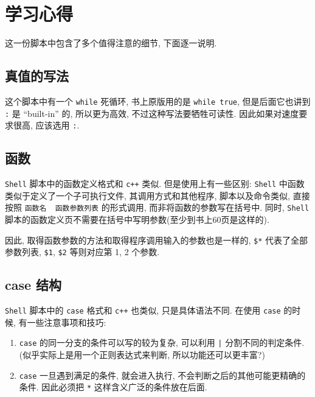 \documentclass{ctexart}
\begin{document}
\section{学习心得} %
\label{sec:学习心得}
这一份脚本中包含了多个值得注意的细节, 下面逐一说明. \par
\subsection{真值的写法} %
\label{sub:真值的写法}
这个脚本中有一个 \verb|while| 死循环, 书上原版用的是 \verb|while true|, 但是后面它也讲到 \verb|:| 是 ``built-in'' 的, 所以更为高效, 不过这种写法要牺牲可读性. 因此如果对速度要求很高, 应该选用 \verb|:|.
\subsection{函数} %
\label{sub:函数}
\verb|Shell| 脚本中的函数定义格式和 \verb|c++| 类似. 但是使用上有一些区别: \verb|Shell| 中函数类似于定义了一个子可执行文件, 其调用方式和其他程序, 脚本以及命令类似, 直接按照 \verb|函数名  函数参数列表| 的形式调用, 而非将函数的参数写在括号中. 同时, \verb|Shell| 脚本的函数定义页不需要在括号中写明参数(至少到书上60页是这样的). \par
因此, 取得函数参数的方法和取得程序调用输入的参数也是一样的, \verb|$*| 代表了全部参数列表, \verb|$1|, \verb|$2| 等则对应第 1, 2 个参数.
\subsection{case 结构} %
\label{sub:verb_case_结构}
\verb|Shell| 脚本中的 \verb|case| 格式和 \verb|c++| 也类似, 只是具体语法不同. 在使用 \verb|case| 的时候, 有一些注意事项和技巧:
\begin{enumerate}
	\item \verb|case| 的同一分支的条件可以写的较为复杂, 可以利用 \verb!|! 分割不同的判定条件. (似乎实际上是用一个正则表达式来判断, 所以功能还可以更丰富?)
	\item \verb|case| 一旦遇到满足的条件, 就会进入执行, 不会判断之后的其他可能更精确的条件. 因此必须把 \verb|*| 这样含义广泛的条件放在后面.
\end{enumerate}
\end{document}
